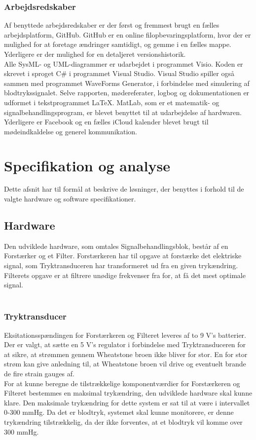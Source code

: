 \subsubsection{Arbejdsredskaber} 
Af benyttede arbejdsredskaber er der først og fremmest brugt en fælles arbejdsplatform, GitHub. GitHub er en online filopbevaringsplatform, hvor der er mulighed for at foretage ændringer samtidigt, og gemme i en fælles mappe. Yderligere er der mulighed for en detaljeret versionshistorik.\\
Alle SysML- og UML-diagrammer er udarbejdet i programmet Visio. Koden er skrevet i sproget C\# i programmet Visual Studio. Visual Studio spiller også sammen med programmet WaveForms Generator, i forbindelse med simulering af blodtrykssignalet. Selve rapporten, mødereferater, logbog og dokumentationen er udformet i tekstprogrammet LaTeX. MatLab, som er et matematik- og signalbehandlingsprogram, er blevet benyttet til at udarbejdelse af hardwaren. Yderligere er Facebook og en fælles iCloud kalender blevet brugt til mødeindkaldelse og generel kommunikation.



\section{Specifikation og analyse}
Dette afsnit har til formål at beskrive de løsninger, der benyttes i forhold til de valgte hardware og software specifikationer. 

\subsection{Hardware}
Den udviklede hardware, som omtales Signalbehandlingsblok, består af en Forstærker og et Filter. Forstærkeren har til opgave at forstærke det elektriske signal, som Tryktransduceren har transformeret ud fra en given trykændring. Filterets opgave er at filtrere unødige frekvenser fra for, at få det mest optimale signal.
\\\\
\subsubsection{Tryktransducer}
Eksitationsspændingen for Forstærkeren og Filteret leveres af to 9 V's batterier. Der er valgt, at sætte en 5 V's regulator i forbindelse med Tryktransduceren for at sikre, at strømmen gennem Wheatstone broen ikke bliver for stor. En for stor strøm kan give anledning til, at Wheatstone broen vil drive og eventuelt brande de fire strain gauges af.\\
For at kunne beregne de tilstrækkelige komponentværdier for Forstærkeren og Filteret bestemmes en maksimal trykændring, den udviklede hardware skal kunne klare. Den maksimale trykændring for dette system er sat til at være i intervallet 0-300 mmHg. Da det er blodtryk, systemet skal kunne monitorere, er denne trykændring tilstrækkelig, da der ikke forventes, at et blodtryk vil komme over 300 mmHg.

